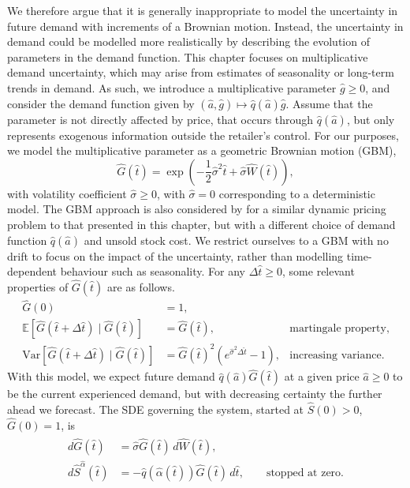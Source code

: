 \documentclass[main.tex]{subfiles}
\begin{document}
We therefore argue that it is generally inappropriate to model the uncertainty
in future demand with increments of a Brownian motion. Instead, the
uncertainty in demand could be modelled more realistically by
describing the evolution of parameters in the demand function.
This chapter focuses on multiplicative demand
uncertainty, which may arise from estimates of seasonality or
long-term trends in demand. As such, we introduce a multiplicative
parameter $\hat{g}\geq 0$, and consider the demand function given by
$({\hat{a}},\hat{g})\mapsto \hat{q}(\hat{a})\hat{g}$.
Assume that the parameter is not directly
affected by price, that occurs through $\hat{q}(\hat{a})$,
but  only represents exogenous information outside the
retailer's control.
For our purposes, we model the multiplicative parameter as
a geometric Brownian motion (GBM),
\begin{equation}
  \hat{G}(\hat{t}) = \exp\left(
    -\frac{1}{2}\hat{\sigma}^2\hat{t} +\hat{\sigma}
    \hat{W}(\hat{t})\right),
\end{equation}
with volatility coefficient
$\hat{\sigma}\geq 0$, with $\hat{\sigma}=0$ corresponding to a
deterministic model. The GBM approach is also considered
by \citet{xu2006monopolistic} for a similar dynamic pricing problem to
that presented in this chapter, but with a different choice of demand function
$\hat{q}(\hat{a})$ and unsold stock cost.
We restrict ourselves to a GBM with no
drift to focus on the impact of the uncertainty, rather than modelling
time-dependent behaviour such as seasonality.
For any $\Delta{\hat{t}}\geq 0$, some relevant properties of $\hat{G}(\hat{t})$ are as follows.
\begin{align}
  \hat{G}(0)
  &=1,\\
  \mathbb{E}[\hat{G}(\hat{t}+\Delta{\hat{t}})\mid \hat{G}(\hat{t})]
  &=\hat{G}(\hat{t}),
  &\text{martingale property,}\\
  \mbox{Var}[\hat{G}(\hat{t}+\Delta{\hat{t}})\mid
  \hat{G}(\hat{t})]&={\hat{G}(\hat{t})}^2(e^{\hat{\sigma}^2
                     \Delta{\hat{t}}}-1), & \text{increasing variance.}
\end{align}
With this model, we expect future demand $\hat{q}(\hat{a})\hat{G}(\hat{t})$ at a given price $\hat{a}\geq
0$ to be the current experienced demand, but with decreasing certainty
the further ahead we forecast.
The SDE governing the system, started at
$\hat{S}(0)>0$, $\hat{G}(0)=1$, is
\begin{align}
  \begin{split}\label{eq:gbm_sde}
    d\hat{G}(\hat{t})&=\hat{\sigma} \hat{G}(\hat{t})\,d\hat{W}(\hat{t}),\\
    d\hat{S}^{\hat{\alpha}}(\hat{t})&=-\hat{q}(\hat{\alpha}(\hat{t}))\hat{G}(\hat{t})\,
    d\hat{t},\qquad\text{stopped at zero}.
  \end{split}
\end{align}
\end{document}
